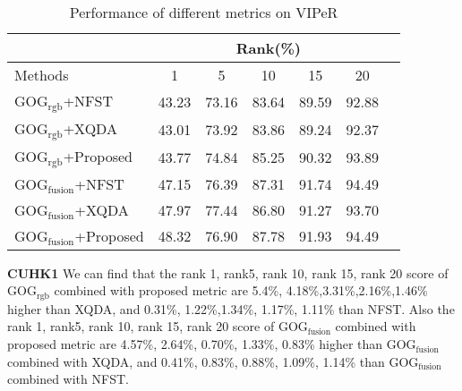 \documentclass[conference,compsoc]{IEEEtran}
\begin{document}
\begin{table}[H]
  
\caption{Performance of different metrics on VIPeR}

\centering
 \begin{tabular}{|l|c|c|c|c|c|c|}
\hline
& \multicolumn{5}{|c|}{Rank(\%)} \\
\hline
Methods& 1 & 5 &10& 15&20\\
\hline
GOG$_\text{rgb}$+NFST& 43.23&73.16 &83.64 & 89.59&92.88\\  
\hline
GOG$_\text{rgb}$+XQDA& 43.01&73.92&83.86& 89.24& 92.37\\
\hline
GOG$_\text{rgb}$+Proposed&43.77 &74.84&85.25&90.32&93.89\\   %
\hline
GOG$_\text{fusion}$+NFST&47.15& 76.39&87.31&91.74&94.49\\
\hline
GOG$_\text{fusion}$+XQDA& 47.97& 77.44& 86.80& 91.27&93.70\\  
\hline
GOG$_\text{fusion}$+Proposed&48.32&76.90&87.78&91.93&94.49\\ %
\hline
\end{tabular}
\end{table}
\textbf{CUHK1} We can find that the rank 1, rank5, rank 10, rank 15, rank 20 score of GOG$_\text{rgb}$ combined with proposed metric are 5.4\%, 4.18\%,3.31\%,2.16\%,1.46\% higher than XQDA, and 0.31\%, 1.22\%,1.34\%, 1.17\%, 1.11\% than NFST.  Also the  rank 1, rank5, rank 10, rank 15, rank 20 score of GOG$_\text{fusion}$ combined with proposed metric are 4.57\%, 2.64\%, 0.70\%, 1.33\%, 0.83\% higher than GOG$_\text{fusion}$ combined with XQDA, and 0.41\%, 0.83\%, 0.88\%, 1.09\%, 1.14\% than GOG$_\text{fusion}$ combined with NFST. 

\end{document}

